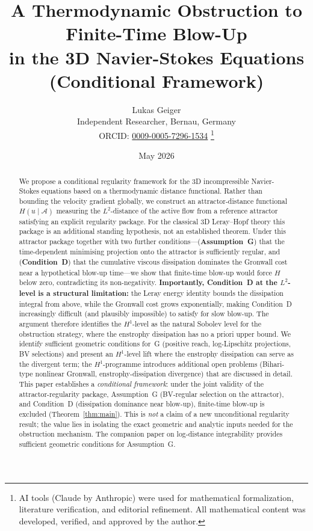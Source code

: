 \documentclass[12pt,a4paper]{article}
\title{\textbf{A Thermodynamic Obstruction to Finite-Time Blow-Up\\ in the 3D Navier-Stokes Equations (Conditional Framework)}}
\author{Lukas Geiger\\
\small Independent Researcher, Bernau, Germany\\
\small ORCID: \href{https://orcid.org/0009-0005-7296-1534}{0009-0005-7296-1534}%
\thanks{AI tools (Claude by Anthropic) were used for mathematical formalization, literature verification, and editorial refinement. All mathematical content was developed, verified, and approved by the author.}}
\date{May 2026}
\theoremstyle{definition}
\theoremstyle{plain}
\theoremstyle{remark}
\begin{document}
\maketitle

\begin{abstract}
We propose a conditional regularity framework for the 3D incompressible Navier-Stokes equations based on a thermodynamic distance functional. Rather than bounding the velocity gradient globally, we construct an attractor-distance functional $H(u \mid \mathcal{A})$ measuring the $L^2$-distance of the active flow from a reference attractor satisfying an explicit regularity package. For the classical 3D Leray--Hopf theory this package is an additional standing hypothesis, not an established theorem. Under this attractor package together with two further conditions---(\textbf{Assumption~G}) that the time-dependent minimising projection onto the attractor is sufficiently regular, and (\textbf{Condition~D}) that the cumulative viscous dissipation dominates the Gronwall cost near a hypothetical blow-up time---we show that finite-time blow-up would force $H$ below zero, contradicting its non-negativity.  \textbf{Importantly, Condition~D at the $L^2$-level is a structural limitation:} the Leray energy identity bounds the dissipation integral from above, while the Gronwall cost grows exponentially, making Condition~D increasingly difficult (and plausibly impossible) to satisfy for slow blow-up.  The argument therefore identifies the $H^1$-level as the natural Sobolev level for the obstruction strategy, where the enstrophy dissipation has no a priori upper bound.
We identify sufficient geometric conditions for~G (positive reach, log-Lipschitz projections, BV selections) and present an $H^1$-level lift where the enstrophy dissipation can serve as the divergent term; the $H^1$-programme introduces additional open problems (Bihari-type nonlinear Gronwall, enstrophy-dissipation divergence) that are discussed in detail.
This paper establishes a \emph{conditional framework}: under the joint validity of the attractor-regularity package, Assumption~G (BV-regular selection on the attractor), and Condition~D (dissipation dominance near blow-up), finite-time blow-up is excluded (Theorem~\ref{thm:main}).  This is \emph{not} a claim of a new unconditional regularity result; the value lies in isolating the exact geometric and analytic inputs needed for the obstruction mechanism. The companion paper on log-distance integrability \cite{Geiger2026-LDI} provides sufficient geometric conditions for Assumption~G.
\end{abstract}
\end{document}

